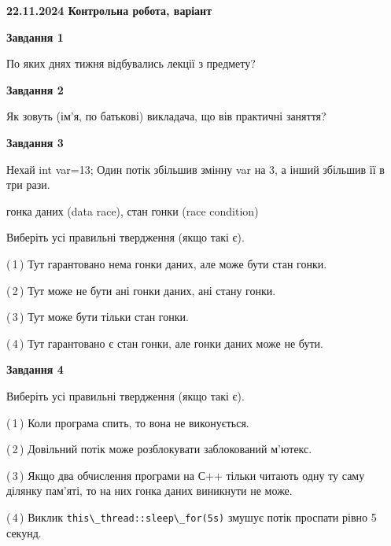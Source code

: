 \documentclass[12pt, ukrainian]{article}
\def\code#1{\Verb!#1!}
\begin{document}
\begin {large}

\textbf{22.11.2024 Контрольна робота, варіант  }\par


{

\begin{center}
\textbf{Завдання 1}
\end{center}

По яких днях тижня відбувались лекції з предмету?


\begin{center}
\textbf{Завдання 2}
\end{center}

Як зовуть (ім'я, по батькові) викладача, що вів практичні заняття?


\begin{center}
\textbf{Завдання 3}
\end{center}

Нехай int var=13; Один потік збільшив змінну var на 3, а інший збільшив її в три рази.

гонка даних (data race), стан гонки (race condition)

Виберіть усі правильні твердження (якщо такі є).\par
\vspace{2mm}
(\,1\,) Тут гарантовано нема гонки даних, але може бути стан гонки.%

(\,2\,) Тут може не бути ані гонки даних, ані стану гонки.%

(\,3\,) Тут може бути тільки стан гонки.%

(\,4\,) Тут гарантовано є стан гонки, але гонки даних може не бути.%


\begin{center}
\textbf{Завдання 4}
\end{center}

Виберіть усі правильні твердження (якщо такі є).\par
\vspace{2mm}

(\,1\,) Коли програма спить, то вона не виконується.%

(\,2\,) Довільний потік може розблокувати заблокований м’ютекс.%

(\,3\,) Якщо два обчислення програми на С++ тільки читають одну ту саму ділянку пам'яті, то на них гонка даних  виникнути не може.%

(\,4\,) Виклик \code{this\_thread::sleep\_for(5s)} змушує потік проспати рівно 5 секунд.%


}
\end{large}
\end{document}
